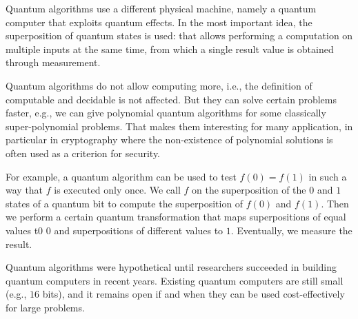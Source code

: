 Quantum algorithms use a different physical machine, namely a quantum computer that exploits quantum effects.
In the most important idea, the superposition of quantum states is used: that allows performing a computation on multiple inputs at the same time, from which a single result value is obtained through measurement.

Quantum algorithms do not allow computing more, i.e., the definition of computable and decidable is not affected.
But they can solve certain problems faster, e.g., we can give polynomial quantum algorithms for some classically super-polynomial problems.
That makes them interesting for many application, in particular in cryptography where the non-existence of polynomial solutions is often used as a criterion for security.

For example, a quantum algorithm can be used to test $f(0)=f(1)$ in such a way that $f$ is executed only once.
We call $f$ on the superposition of the $0$ and $1$ states of a quantum bit to compute the superposition of $f(0)$ and $f(1)$.
Then we perform a certain quantum transformation that maps superpositions of equal values t0 $0$ and superpositions of different values to $1$.
Eventually, we measure the result.

Quantum algorithms were hypothetical until researchers succeeded in building quantum computers in recent years.
Existing quantum computers are still small (e.g., $16$ bits), and it remains open if and when they can be used cost-effectively for large problems.